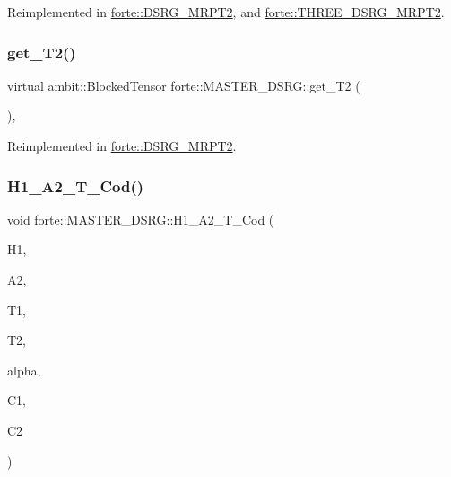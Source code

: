 Reimplemented in \mbox{\hyperlink{classforte_1_1_d_s_r_g___m_r_p_t2_a02e0b5b0716ac974c03b8ed5cef17980}{forte\+::\+D\+S\+R\+G\+\_\+\+M\+R\+P\+T2}}, and \mbox{\hyperlink{classforte_1_1_t_h_r_e_e___d_s_r_g___m_r_p_t2_ab6313c66e40f8b599c323bf3077a827f}{forte\+::\+T\+H\+R\+E\+E\+\_\+\+D\+S\+R\+G\+\_\+\+M\+R\+P\+T2}}.

\mbox{\label{classforte_1_1_m_a_s_t_e_r___d_s_r_g_a409d404b009c1c4c17b07beb62d7e280}} 
\subsubsection{\texorpdfstring{get\+\_\+\+T2()}{get\_T2()}\hspace{0.1cm}{\footnotesize\ttfamily [2/2]}}
{\footnotesize\ttfamily virtual ambit\+::\+Blocked\+Tensor forte\+::\+M\+A\+S\+T\+E\+R\+\_\+\+D\+S\+R\+G\+::get\+\_\+\+T2 (\begin{DoxyParamCaption}{ }\end{DoxyParamCaption})\hspace{0.3cm}{\ttfamily [inline]}, {\ttfamily [virtual]}}



Reimplemented in \mbox{\hyperlink{classforte_1_1_d_s_r_g___m_r_p_t2_af60895decfd8d368a6b61648b8f82310}{forte\+::\+D\+S\+R\+G\+\_\+\+M\+R\+P\+T2}}.

\mbox{\label{classforte_1_1_m_a_s_t_e_r___d_s_r_g_a0be012ac81de463a27159cd21e332828}} 
\subsubsection{\texorpdfstring{H1\+\_\+\+A2\+\_\+\+T\+\_\+\+Cod()}{H1\_A2\_T\_Cod()}}
{\footnotesize\ttfamily void forte\+::\+M\+A\+S\+T\+E\+R\+\_\+\+D\+S\+R\+G\+::\+H1\+\_\+\+A2\+\_\+\+T\+\_\+\+Cod (\begin{DoxyParamCaption}\item[{Blocked\+Tensor \&}]{H1,  }\item[{Blocked\+Tensor \&}]{A2,  }\item[{Blocked\+Tensor \&}]{T1,  }\item[{Blocked\+Tensor \&}]{T2,  }\item[{const double \&}]{alpha,  }\item[{Blocked\+Tensor \&}]{C1,  }\item[{Blocked\+Tensor \&}]{C2 }\end{DoxyParamCaption})\hspace{0.3cm}{\ttfamily [protected]}}



